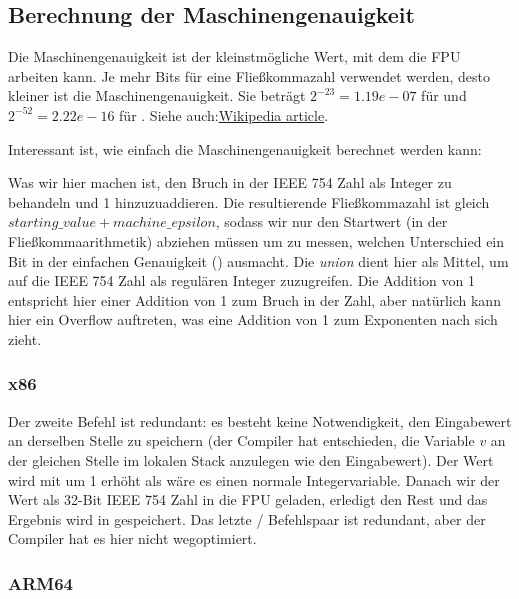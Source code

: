 \subsection{Berechnung der Maschinengenauigkeit}
Die Maschinengenauigkeit ist der kleinstmögliche Wert, mit dem die \ac{FPU} arbeiten kann.
Je mehr Bits für eine Fließkommazahl verwendet werden, desto kleiner ist die Maschinengenauigkeit.
Sie beträgt $2^{-23} = 1.19e-07$ für \Tfloat und $2^{-52} = 2.22e-16$ für \Tdouble.
Siehe auch:\href{https://en.wikipedia.org/wiki/Arithmetic_underflow}{Wikipedia article}.

Interessant ist, wie einfach die Maschinengenauigkeit berechnet werden kann:


Was wir hier machen ist, den Bruch in der IEEE 754 Zahl als Integer zu behandeln und 1 hinzuzuaddieren.
Die resultierende Fließkommazahl ist gleich $starting\_value+machine\_epsilon$, sodass wir nur den Startwert (in der
Fließkommaarithmetik) abziehen müssen um zu messen, welchen Unterschied ein Bit in der einfachen Genauigkeit (\Tfloat)
ausmacht.
Die \emph{union} dient hier als Mittel, um auf die IEEE 754 Zahl als regulären Integer zuzugreifen.
Die Addition von 1 entspricht hier einer Addition von 1 zum Bruch in der Zahl, aber natürlich kann hier ein Overflow
auftreten, was eine Addition von 1 zum Exponenten nach sich zieht.

\subsubsection{x86}


Der zweite  Befehl ist redundant: es besteht keine Notwendigkeit, den Eingabewert an derselben Stelle zu
speichern (der Compiler hat entschieden, die Variable $v$ an der gleichen Stelle im lokalen Stack anzulegen wie den
Eingabewert).
Der Wert wird mit  um 1 erhöht als wäre es einen normale Integervariable.
Danach wir der Wert als 32-Bit IEEE 754 Zahl in die FPU geladen,  erledigt den Rest und das Ergebnis wird in
 gespeichert.
Das letzte / Befehlspaar ist redundant, aber der Compiler hat es hier nicht wegoptimiert.

\subsubsection{ARM64}

